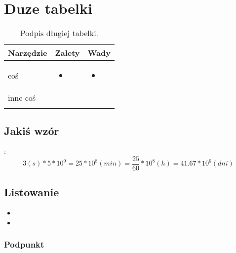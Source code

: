 \chapter{Duze tabelki}
\lipsum[22-26]
\begin{longtable}{|p{2.5cm}|p{6.5cm}|p{6.5cm}|}
	\hline
	\textbf{Narzędzie} &
	\textbf{Zalety} &
	\textbf{Wady} \\ \hline\hline
	coś &\begin{itemize}
		\item \lipsum[1]
	\end{itemize} &
	\begin{itemize}
		\item \lipsum[4]
	\end{itemize}  \\
	\hline
	inne coś & \lipsum[2] & \lipsum[3]\\
	\hline
	\caption{Podpis długiej tabelki.}
	\label{tab:narzedzia}
\end{longtable}

\section{Jakiś wzór}
\noindent \lipsum[7]:
$$3(s) * 5 * 10^{9} = 25 * 10^{8}(min) = \frac{25}{60} * 10^{8}(h) = 41.67 * 10^{6} (dni)\label{obliczenia}$$

\section{Listowanie}
\begin{itemize}
	\item \lipsum[8]
	\item \lipsum[9]
\end{itemize}

\subsection{Podpunkt}
\label{labelka_dla_podpunktu}
\noindent \lipsum[10-12]
